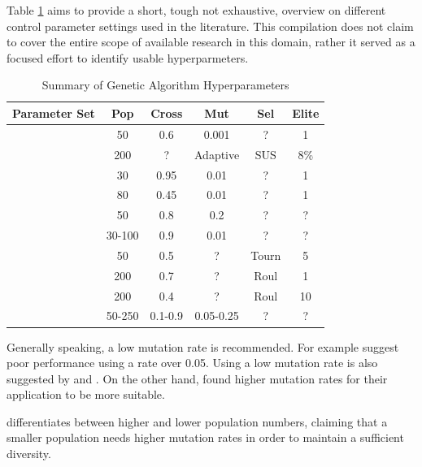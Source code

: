 Table \ref{tab:ga_hyperparameters} aims to provide a short, tough not exhaustive, overview on different control parameter settings used in the literature. This compilation does not claim to cover the entire scope of available research in this domain, rather it served as a focused effort to identify usable hyperparmeters.

\begin{table}[h]
	\centering
	\caption{Summary of Genetic Algorithm Hyperparameters}
	\label{tab:ga_hyperparameters}
	\begin{tabular}{lccccc}
		\hline
		\textbf{Parameter Set} & \textbf{Pop} & \textbf{Cross} & \textbf{Mut} & \textbf{Sel} & \textbf{Elite} \\
		\hline
		\cite{de_jong_analysis_1975} & 50 & 0.6 & 0.001 & ? & 1 \\
		\cite{mills_determining_2015} & 200 & ? & Adaptive & SUS & 8\% \\
		\cite{grefenstette_optimization_1986} & 30 & 0.95 & 0.01 & ? & 1 \\
		\cite{grefenstette_optimization_1986} & 80 & 0.45 & 0.01 & ? & 1 \\
		\cite{almanee_scenorita_2021} & 50 & 0.8 & 0.2 & ? & ? \\
		\cite{srinivas_genetic_1994}  & 30-100 & 0.9 & 0.01 & ? & ? \\
		\cite{fazal_estimating_2005} & 50 & 0.5 & ? & Tourn & 5 \\
		\cite{dao_maximising_2016} & 200 & 0.7 & ? & Roul & 1 \\
		\cite{naruka_parameter_2019} & 200 & 0.4 & ? & Roul & 10 \\
		\cite{jinghui_zhong_comparison_2005} & 50-250 & 0.1-0.9 & 0.05-0.25 & ? & ? \\
		\hline
	\end{tabular}
\end{table}

Generally speaking, a low mutation rate is recommended. For example \cite{grefenstette_optimization_1986} suggest poor performance using a rate over 0.05. Using a low mutation rate is also suggested by \cite{whitley_genetic_1994} and \cite{jinghui_zhong_comparison_2005}. On the other hand, \cite{boyabatli_parameter_2004} found higher mutation rates for their application to be more suitable.

\cite{srinivas_genetic_1994} differentiates between higher and lower population numbers, claiming that a smaller population needs higher mutation rates in order to maintain a sufficient diversity.


